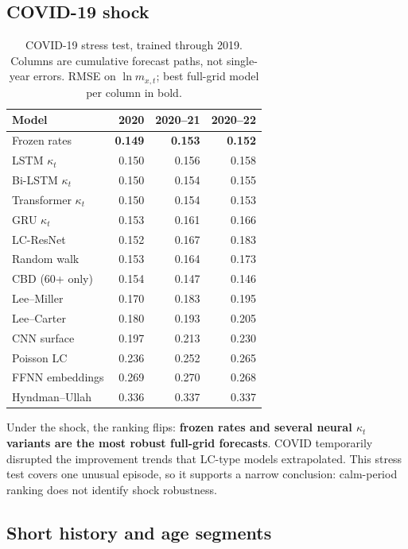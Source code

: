 \documentclass[11pt,a4paper]{article}
\begin{document}
\subsection{COVID-19 shock}

\begin{table}[htbp]
\centering
\caption{COVID-19 stress test, trained through 2019. Columns are cumulative forecast paths, not single-year errors. RMSE on $\ln m_{x,t}$; best full-grid model per column in bold.}
\label{tab:covid}
\small
\begin{tabular}{l RRR}
\toprule
Model & 2020 & 2020--21 & 2020--22 \\
\midrule
Frozen rates       & \textbf{0.149} & \textbf{0.153} & \textbf{0.152} \\
LSTM $\kappa_t$    & 0.150 & 0.156 & 0.158 \\
Bi-LSTM $\kappa_t$ & 0.150 & 0.154 & 0.155 \\
Transformer $\kappa_t$ & 0.150 & 0.154 & 0.153 \\
GRU $\kappa_t$     & 0.153 & 0.161 & 0.166 \\
LC-ResNet          & 0.152 & 0.167 & 0.183 \\
Random walk        & 0.153 & 0.164 & 0.173 \\
CBD (60+ only)     & 0.154 & 0.147 & 0.146 \\
Lee--Miller        & 0.170 & 0.183 & 0.195 \\
Lee--Carter        & 0.180 & 0.193 & 0.205 \\
CNN surface        & 0.197 & 0.213 & 0.230 \\
Poisson LC         & 0.236 & 0.252 & 0.265 \\
FFNN embeddings    & 0.269 & 0.270 & 0.268 \\
Hyndman--Ullah     & 0.336 & 0.337 & 0.337 \\
\bottomrule
\end{tabular}
\end{table}

Under the shock, the ranking flips: \textbf{frozen rates and several neural $\kappa_t$ variants are the most robust full-grid forecasts}. COVID temporarily disrupted the improvement trends that LC-type models extrapolated. This stress test covers one unusual episode, so it supports a narrow conclusion: calm-period ranking does not identify shock robustness.

\subsection{Short history and age segments}
\end{document}
